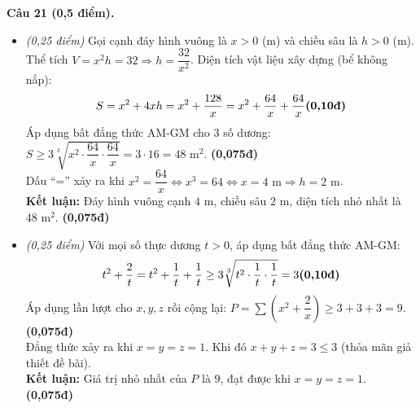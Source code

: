 \documentclass[11pt,a4paper]{article}
\begin{document}
\vspace{1mm}
\textbf{Câu 21 (0,5 điểm).}
\begin{itemize}
  \item[a)] \textit{(0,25 điểm)} Gọi cạnh đáy hình vuông là $x > 0$ (m) và chiều sâu là $h > 0$ (m).\\
  Thể tích $V = x^2 h = 32 \Rightarrow h = \dfrac{32}{x^2}$. Diện tích vật liệu xây dựng (bể không nắp):
  \[
  S = x^2 + 4xh = x^2 + \dfrac{128}{x} = x^2 + \dfrac{64}{x} + \dfrac{64}{x} \hfill \textbf{(0,10đ)}
  \]
  Áp dụng bất đẳng thức AM-GM cho 3 số dương: $S \ge 3\sqrt[3]{x^2 \cdot \dfrac{64}{x} \cdot \dfrac{64}{x}} = 3 \cdot 16 = 48\text{ m}^2$. \hfill \textbf{(0,075đ)}\\
  Dấu ``='' xảy ra khi $x^2 = \dfrac{64}{x} \Leftrightarrow x^3 = 64 \Leftrightarrow x = 4\text{ m} \Rightarrow h = 2\text{ m}$.\\
  \textbf{Kết luận:} Đáy hình vuông cạnh $4\text{ m}$, chiều sâu $2\text{ m}$, diện tích nhỏ nhất là $48\text{ m}^2$. \hfill \textbf{(0,075đ)}

  \item[b)] \textit{(0,25 điểm)} Với mọi số thực dương $t > 0$, áp dụng bất đẳng thức AM-GM:
  \[
  t^2 + \dfrac{2}{t} = t^2 + \dfrac{1}{t} + \dfrac{1}{t} \ge 3\sqrt[3]{t^2 \cdot \dfrac{1}{t} \cdot \dfrac{1}{t}} = 3 \hfill \textbf{(0,10đ)}
  \]
  Áp dụng lần lượt cho $x, y, z$ rồi cộng lại: $P = \sum \left(x^2 + \dfrac{2}{x}\right) \ge 3 + 3 + 3 = 9$. \hfill \textbf{(0,075đ)}\\
  Đẳng thức xảy ra khi $x = y = z = 1$. Khi đó $x + y + z = 3 \le 3$ (thỏa mãn giả thiết đề bài).\\
  \textbf{Kết luận:} Giá trị nhỏ nhất của $P$ là $9$, đạt được khi $x = y = z = 1$. \hfill \textbf{(0,075đ)}
\end{itemize}
\end{document}
